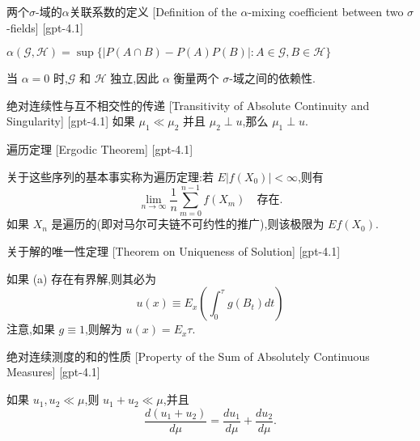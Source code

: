 \documentclass[UTF8]{ctexart}
\begin{document}
    
    
    \begin{dfn}
        {两个$\sigma$-域的$\alpha$关联系数的定义}
        [Definition of the $\alpha$-mixing coefficient between two $\sigma$-fields]
        [gpt-4.1]
        
$\alpha ( \mathcal{G}, \mathcal{H} ) = \sup \{ | P ( A \cap B ) - P ( A ) P ( B ) | : A \in \mathcal{G}, B \in \mathcal{H} \}$

当 $\alpha = 0$ 时,$\mathcal{G}$ 和 $\mathcal{H}$ 独立,因此 $\alpha$ 衡量两个 $\sigma$-域之间的依赖性.

    \end{dfn}
    
    
    
    \begin{thm}
        {绝对连续性与互不相交性的传递}
        [Transitivity of Absolute Continuity and Singularity]
        [gpt-4.1]
        如果 $\mu_{1} \ll \mu_{2}$ 并且 $\mu_{2} \perp 
u$,那么 $\mu_{1} \perp 
u$.
    \end{thm}
    
    
    
    \begin{thm}
        {遍历定理}
        [Ergodic Theorem]
        [gpt-4.1]
        
关于这些序列的基本事实称为遍历定理:若 $E | f ( X _ { 0 } ) | < \infty$,则有
\[
\lim_{n \to \infty} \frac{1}{n} \sum_{m=0}^{n-1} f(X_m) \quad \text{存在}.
\]
如果 $X_n$ 是遍历的(即对马尔可夫链不可约性的推广),则该极限为 $E f ( X _ { 0 } )$.

    \end{thm}
    
    
    
    \begin{thm}
        {关于解的唯一性定理}
        [Theorem on Uniqueness of Solution]
        [gpt-4.1]
        
如果 (a) 存在有界解,则其必为
\[
u(x) \equiv E_x \left( \int_0^{\tau} g(B_t) dt \right)
\]
注意,如果 $g \equiv 1$,则解为 $
u(x) = E_x \tau$.

    \end{thm}
    
    
    
    \begin{ppt}
        {绝对连续测度的和的性质}
        [Property of the Sum of Absolutely Continuous Measures]
        [gpt-4.1]
        
如果 $
u_{1}, 
u_{2} \ll \mu$,则 $
u_{1} + 
u_{2} \ll \mu$,并且
\[
\frac{d(
u_{1} + 
u_{2})}{d\mu} = \frac{d
u_{1}}{d\mu} + \frac{d
u_{2}}{d\mu}.
\]

    \end{ppt}
    
\end{document}
